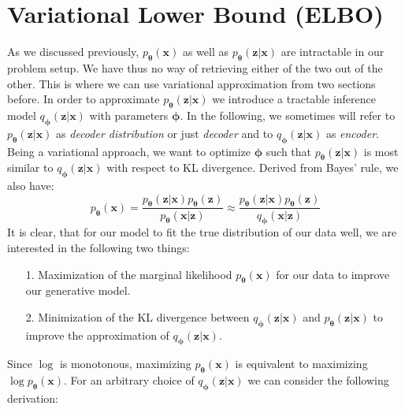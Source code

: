 \documentclass[12pt]{report}
\theoremstyle{definition}
\begin{document}
\section{Variational Lower Bound (ELBO)}
As we discussed previously, $p_{\pmb{\theta}}(\mathbf{x})$ as well as $p_{\pmb{\theta}}(\mathbf{z}|\mathbf{x})$ are intractable in our problem setup. We have thus no way of retrieving either of the two out of the other. This is where we can use variational approximation from two sections before. In order to approximate $p_{\pmb{\theta}}(\mathbf{z}|\mathbf{x})$ we introduce a tractable inference model $q_{\pmb{\phi}}(\mathbf{z}|\mathbf{x})$ with parameters $\pmb{\phi}$. In the following, we sometimes will refer to $p_{\pmb{\theta}}(\mathbf{z}|\mathbf{x})$ as \emph{decoder distribution} or just \emph{decoder} and to $q_{\pmb{\phi}}(\mathbf{z}|\mathbf{x})$ as \emph{encoder}. Being a variational approach, we want to optimize $\pmb{\phi}$ such that $p_{\pmb{\theta}}(\mathbf{z}|\mathbf{x})$ is most similar to $q_{\pmb{\phi}}(\mathbf{z}|\mathbf{x})$ with respect to KL divergence.
Derived from Bayes' rule, we also have:
\begin{equation}
	p_{\pmb{\theta}}(\mathbf{x}) = \frac{p_{\pmb{\theta}}(\mathbf{z}|\mathbf{x}) p_{\pmb{\theta}}(\mathbf{z})}{p_{\pmb{\theta}}(\mathbf{x}|\mathbf{z})} \approx  \frac{p_{\pmb{\theta}}(\mathbf{z}|\mathbf{x}) p_{\pmb{\theta}}(\mathbf{z})}{q_{\pmb{\phi}}(\mathbf{x}|\mathbf{z})}
\end{equation}
It is clear, that for our model to fit the true distribution of our data well, we are interested in the following two things:
\begin{itemize}
	\item[1.] Maximization of the marginal likelihood $p_{\pmb{\theta}}(\mathbf{x})$ for our data to improve our generative model.
	\item[2.] Minimization of the KL divergence between $q_{\pmb{\phi}}(\mathbf{z}|\mathbf{x})$ and $p_{\pmb{\theta}}(\mathbf{z}|\mathbf{x})$ to improve the approximation of $q_{\pmb{\phi}}(\mathbf{z}|\mathbf{x})$.
\end{itemize}
Since $\log$ is monotonous, maximizing $p_{\pmb{\theta}}(\mathbf{x})$ is equivalent to maximizing $\log p_{\pmb{\theta}}(\mathbf{x})$. For an arbitrary choice of $q_{\pmb{\phi}}(\mathbf{z}|\mathbf{x})$ we can consider the following derivation:
\end{document}
